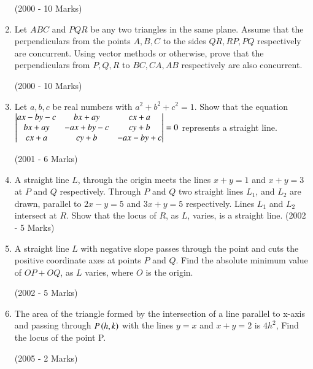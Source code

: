\documentclass[journal,12pt,twocolumn]{IEEEtran}
\theoremstyle{remark}
\begin{document}
\begin{enumerate}
	\hfill{(2000 - 10 Marks)}

\item Let $ABC$ and $PQR$ be any two triangles in the same plane.
Assume that the perpendiculars from the points $A, B, C$ to 
the sides $QR, RP, PQ$ respectively are concurrent. Using vector methods or otherwise, prove that the perpendiculars from $P, Q, R$ to $BC, CA, AB$ respectively are also concurrent. 

	\hfill{(2000 - 10 Marks)}

\item Let $a, b, c$ be real numbers with $a^{2}+b^{2}+c^{2}=1$. Show that the equation $\begin{vmatrix}
ax-by-c     &bx+ay       &cx+a      \\
bx+ay       &-ax+by-c   &cy+b       \\
cx+a         &cy+b         &-ax-by+c \\\end{vmatrix} =0$
represents a straight line.

\hfill{(2001 - 6 Marks)}

\item A straight line $L$, through the origin meets the lines $x+y=1$ and $x+y=3$ at $P$ and $Q$ respectively. Through $P$ and $Q$ two 
straight lines $L_{1}$, and $L_{2}$ are drawn, parallel to $2x-y=5$ and $3x+y=5$ respectively. Lines $L_{1}$ and $L_{2}$ intersect at $R$. Show 
that the locus of $R$, as $L$, varies, is a straight line. 
\hfill{(2002 - 5 Marks)}

\item A straight line $L$ with negative slope passes through the 
point  and cuts the positive coordinate axes at points 
$P$ and $Q$. Find the absolute minimum value of $OP + OQ$, as $L$ 
varies, where $O$ is the origin.

\hfill{(2002 - 5 Marks)}

\item The area of the triangle formed by the intersection of a line 
parallel to x-axis and passing through $P\left(h, k\right)$ with the lines 
$y=x$ and $x+y=2$ is $4h^{2}$, Find the locus of the point P.

\hfill{(2005 - 2 Marks)}

\end{enumerate}
\end{document}
